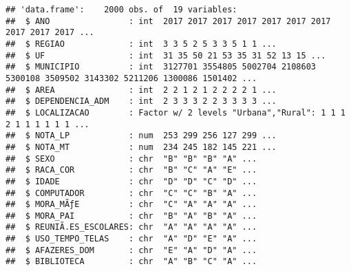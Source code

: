 \documentclass[
]{article}
\newenvironment{Shaded}{\begin{snugshade}}{\end{snugshade}}
\newcommand{\AttributeTok}[1]{\textcolor[rgb]{0.77,0.63,0.00}{#1}}
\newcommand{\CommentTok}[1]{\textcolor[rgb]{0.56,0.35,0.01}{\textit{#1}}}
\newcommand{\ConstantTok}[1]{\textcolor[rgb]{0.00,0.00,0.00}{#1}}
\newcommand{\ControlFlowTok}[1]{\textcolor[rgb]{0.13,0.29,0.53}{\textbf{#1}}}
\newcommand{\DecValTok}[1]{\textcolor[rgb]{0.00,0.00,0.81}{#1}}
\newcommand{\FunctionTok}[1]{\textcolor[rgb]{0.00,0.00,0.00}{#1}}
\newcommand{\NormalTok}[1]{#1}
\newcommand{\OtherTok}[1]{\textcolor[rgb]{0.56,0.35,0.01}{#1}}
\newcommand{\SpecialCharTok}[1]{\textcolor[rgb]{0.00,0.00,0.00}{#1}}
\newcommand{\StringTok}[1]{\textcolor[rgb]{0.31,0.60,0.02}{#1}}
\begin{document}
\begin{verbatim}
## 'data.frame':    2000 obs. of  19 variables:
##  $ ANO                : int  2017 2017 2017 2017 2017 2017 2017 2017 2017 2017 ...
##  $ REGIAO             : int  3 3 5 2 5 3 3 5 1 1 ...
##  $ UF                 : int  31 35 50 21 53 35 31 52 13 15 ...
##  $ MUNICIPIO          : int  3127701 3554805 5002704 2108603 5300108 3509502 3143302 5211206 1300086 1501402 ...
##  $ AREA               : int  2 2 1 2 1 2 2 2 2 1 ...
##  $ DEPENDENCIA_ADM    : int  2 3 3 3 2 2 3 3 3 3 ...
##  $ LOCALIZACAO        : Factor w/ 2 levels "Urbana","Rural": 1 1 1 2 1 1 1 1 1 1 ...
##  $ NOTA_LP            : num  253 299 256 127 299 ...
##  $ NOTA_MT            : num  234 245 182 145 221 ...
##  $ SEXO               : chr  "B" "B" "B" "A" ...
##  $ RACA_COR           : chr  "B" "C" "A" "E" ...
##  $ IDADE              : chr  "D" "D" "C" "D" ...
##  $ COMPUTADOR         : chr  "C" "C" "B" "A" ...
##  $ MORA_MÃƒE          : chr  "C" "A" "A" "A" ...
##  $ MORA_PAI           : chr  "B" "A" "B" "A" ...
##  $ REUNIÃ.ES_ESCOLARES: chr  "A" "A" "A" "A" ...
##  $ USO_TEMPO_TELAS    : chr  "A" "D" "E" "A" ...
##  $ AFAZERES_DOM       : chr  "E" "A" "D" "A" ...
##  $ BIBLIOTECA         : chr  "A" "B" "C" "A" ...
\end{verbatim}

\begin{Shaded}
\end{Shaded}
\end{document}
